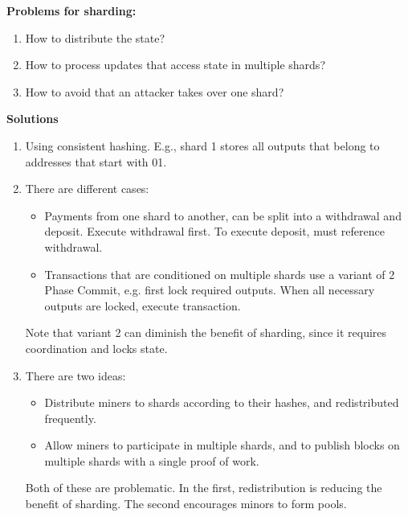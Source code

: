 \begin{note} \textbf{Problems for sharding:}
	\begin{enumerate}[label=\Alph*)]
		\item How to distribute the state?
		\item How to process updates that access state in multiple shards?
		\item How to avoid that an attacker takes over one shard?
	\end{enumerate}
\noindent
\textbf{Solutions}
\begin{enumerate}[label=\Alph*)]
	\item Using consistent hashing. E.g., shard 1 stores all outputs that belong to addresses that start with 01.
	\item There are different cases:
	\begin{itemize}
		\item Payments from one shard to another, can be split into a withdrawal and deposit. Execute withdrawal first. To execute deposit, must reference withdrawal.
		\item Transactions that are conditioned on multiple shards use a variant of 2 Phase Commit, e.g. first lock required outputs. When all necessary outputs are locked, execute transaction.
	\end{itemize}
	Note that variant 2 can diminish the benefit of sharding, since it requires coordination and locks state.
	\item There are two ideas:
	\begin{itemize}
		\item Distribute miners to shards according to their hashes, and redistributed frequently.
		\item Allow miners to participate in multiple shards, and to publish blocks on multiple shards with a single proof of work. 
		
	\end{itemize}
	Both of these are problematic. In the first, redistribution is reducing the benefit of sharding. The second encourages minors to form pools.
\end{enumerate}

\end{note}